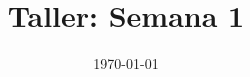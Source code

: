 \documentclass[a4paper]{article}
\date{\today}
\title{Taller: Semana 1}
\begin{document}
\header{}

\begin{answer}[Problema 1.]

\end{answer}
\end{document}
